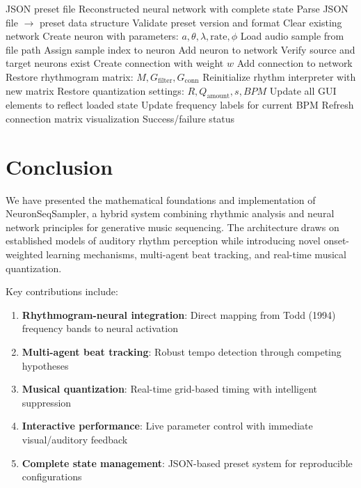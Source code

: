 \documentclass[11pt,a4paper]{article}
\begin{document}
\begin{algorithm}
\caption{Preset Loading and Network Reconstruction}
\begin{algorithmic}[1]
\REQUIRE JSON preset file
\ENSURE Reconstructed neural network with complete state
\STATE Parse JSON file $\rightarrow$ preset data structure
\STATE Validate preset version and format
\STATE Clear existing network
    \STATE Create neuron with parameters: $a, \theta, \lambda, \text{rate}, \phi$
    \STATE Load audio sample from file path
    \STATE Assign sample index to neuron
    \STATE Add neuron to network
\ENDFOR
{}
    \STATE Verify source and target neurons exist
    \STATE Create connection with weight $w$
    \STATE Add connection to network
\ENDFOR
\STATE Restore rhythmogram matrix: $M, G_{\text{filter}}, G_{\text{conn}}$
\STATE Reinitialize rhythm interpreter with new matrix
\STATE Restore quantization settings: $R, Q_{\text{amount}}, s, BPM$
\STATE Update all GUI elements to reflect loaded state
\STATE Update frequency labels for current BPM
\STATE Refresh connection matrix visualization
\RETURN Success/failure status
\end{algorithmic}
\end{algorithm}

\section{Conclusion}

We have presented the mathematical foundations and implementation of NeuronSeqSampler, a hybrid system combining rhythmic analysis and neural network principles for generative music sequencing. The architecture draws on established models of auditory rhythm perception while introducing novel onset-weighted learning mechanisms, multi-agent beat tracking, and real-time musical quantization.

Key contributions include:
\begin{enumerate}
\item \textbf{Rhythmogram-neural integration}: Direct mapping from Todd (1994) frequency bands to neural activation
\item \textbf{Multi-agent beat tracking}: Robust tempo detection through competing hypotheses
\item \textbf{Musical quantization}: Real-time grid-based timing with intelligent suppression
\item \textbf{Interactive performance}: Live parameter control with immediate visual/auditory feedback
\item \textbf{Complete state management}: JSON-based preset system for reproducible configurations
\end{enumerate}
\end{document}
